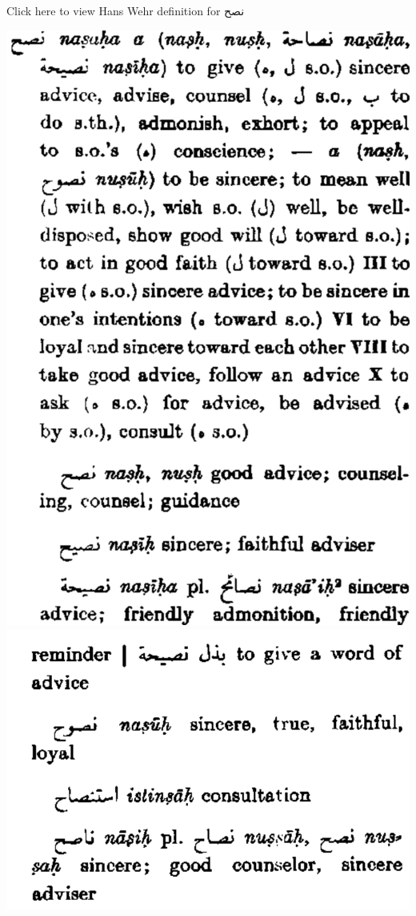 \documentclass[
]{book}
\begin{document}
Click here to view Hans Wehr definition for نصح

\includegraphics{images/nasaha_1.png}
\includegraphics{images/nasaha_2.png}
\end{document}
